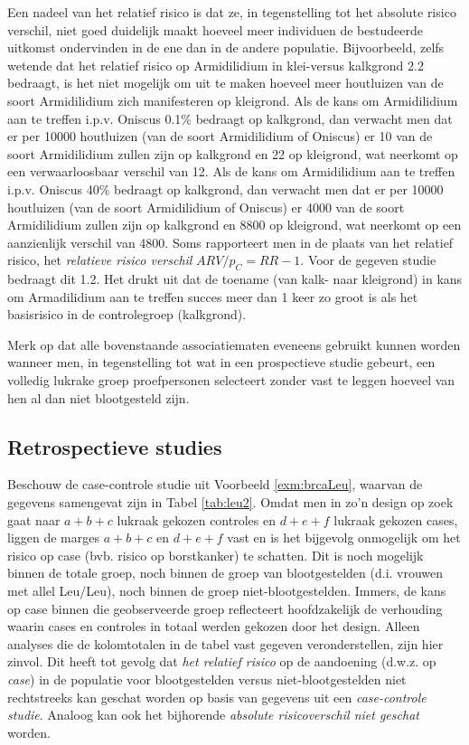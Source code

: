 \documentclass[
  12pt,dutch,coursenotes]{book}
\begin{document}
Een nadeel van het relatief risico is dat ze, in tegenstelling tot het absolute risico verschil, niet goed duidelijk maakt hoeveel meer individuen de bestudeerde uitkomst ondervinden in de ene dan in de andere populatie. Bijvoorbeeld, zelfs wetende dat het relatief risico op Armidilidium in klei-versus kalkgrond 2.2 bedraagt, is het niet mogelijk om uit te maken hoeveel meer houtluizen van de soort Armidilidium zich manifesteren op kleigrond. Als de kans om Armidilidium aan te treffen i.p.v. Oniscus 0.1\% bedraagt op kalkgrond, dan verwacht men dat er per 10000 houtluizen (van de soort Armidilidium of Oniscus) er 10 van de soort Armidilidium zullen zijn op kalkgrond en 22 op kleigrond, wat neerkomt op een verwaarloosbaar verschil van 12. Als de kans om Armidilidium aan te treffen i.p.v. Oniscus 40\% bedraagt op kalkgrond, dan verwacht men dat er per 10000 houtluizen (van de soort Armidilidium of Oniscus) er 4000 van de soort Armidilidium zullen zijn op kalkgrond en 8800 op kleigrond, wat neerkomt op een aanzienlijk verschil van 4800. Soms rapporteert men in de plaats van het relatief risico, het
\emph{relatieve risico verschil} \(ARV/p_C=RR-1\). Voor de gegeven studie
bedraagt dit 1.2. Het drukt uit dat de toename (van kalk- naar kleigrond) in kans om Armadilidium aan te treffen succes meer dan 1 keer zo groot is als het basisrisico in de controlegroep (kalkgrond).

Merk op dat alle bovenstaande associatiematen eveneens gebruikt kunnen
worden wanneer men, in tegenstelling tot wat in een prospectieve studie
gebeurt, een volledig lukrake groep proefpersonen selecteert zonder vast te
leggen hoeveel van hen al dan niet blootgesteld zijn.

\hypertarget{subsec:retrospect}{%
\subsection{Retrospectieve studies}\label{subsec:retrospect}}

Beschouw de case-controle studie uit Voorbeeld \ref{exm:brcaLeu}, waarvan
de gegevens samengevat zijn in Tabel \ref{tab:leu2}. Omdat men in
zo'n design op zoek gaat naar \(a+b+c\) lukraak gekozen controles en \(d+e+f\) lukraak
gekozen cases, liggen de marges \(a+b+c\) en \(d+e+f\) vast en is het bijgevolg
onmogelijk om het risico op case (bvb. risico op borstkanker) te schatten. Dit is noch mogelijk binnen de
totale groep, noch binnen de groep van blootgestelden (d.i. vrouwen met allel Leu/Leu), noch binnen de groep
niet-blootgestelden. Immers, de kans op case binnen die geobserveerde groep reflecteert hoofdzakelijk de verhouding waarin cases en controles in totaal werden gekozen door het design. Alleen analyses die de kolomtotalen
in de tabel vast gegeven veronderstellen, zijn hier zinvol. Dit heeft tot
gevolg dat \emph{het relatief risico} op de aandoening (d.w.z. op \emph{case})
in de populatie voor blootgestelden versus niet-blootgestelden niet
rechtstreeks kan geschat worden op basis van gegevens uit een \emph{case-controle studie}. Analoog kan ook het bijhorende \emph{absolute risicoverschil niet geschat} worden.
\end{document}
